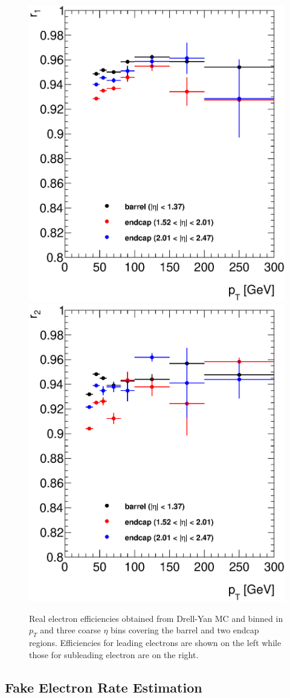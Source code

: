    \begin{figure}[h]
      \begin{center}
      \includegraphics[width=0.48\linewidth]{images/r1.eps}
      \includegraphics[width=0.48\linewidth]{images/r2.eps}
      \end{center}
   \caption{Real electron efficiencies obtained from Drell-Yan MC and binned in $p_{T}$ and three coarse $\eta$ bins covering the barrel and two endcap regions. Efficiencies for leading electrons are shown on the left while those for subleading electron are on the right.}
   \label{fig:realEff}
   \end{figure}



\subsection{Fake Electron Rate Estimation}

